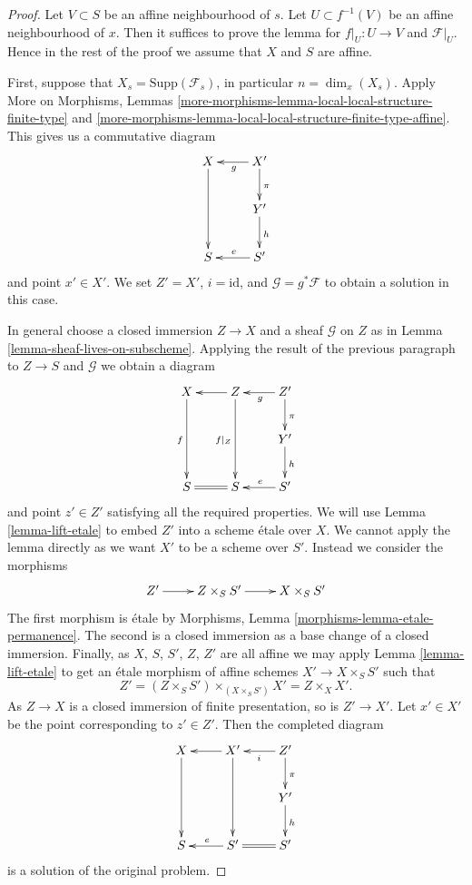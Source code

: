 \begin{proof}
Let $V \subset S$ be an affine neighbourhood of $s$.
Let $U \subset f^{-1}(V)$ be an affine neighbourhood of $x$.
Then it suffices to prove the lemma for $f|_U : U \to V$ and
$\mathcal{F}|_U$. Hence in the rest of the proof we assume that
$X$ and $S$ are affine.

\medskip\noindent
First, suppose that $X_s = \text{Supp}(\mathcal{F}_s)$, in particular
$n = \dim_x(X_s)$. Apply
More on Morphisms,
Lemmas \ref{more-morphisms-lemma-local-local-structure-finite-type} and
\ref{more-morphisms-lemma-local-local-structure-finite-type-affine}.
This gives us a commutative diagram
$$
\xymatrix{
X \ar[dd] & X' \ar[l]^g \ar[d]^\pi \\
& Y' \ar[d]^h  \\
S & S' \ar[l]_e 
}
$$
and point $x' \in X'$. We set $Z' = X'$, $i = \text{id}$, and
$\mathcal{G} = g^*\mathcal{F}$ to obtain a solution in this case.

\medskip\noindent
In general choose a closed immersion $Z \to X$ and a sheaf
$\mathcal{G}$ on $Z$ as in
Lemma \ref{lemma-sheaf-lives-on-subscheme}.
Applying the result of the previous paragraph to $Z \to S$ and
$\mathcal{G}$ we obtain a diagram
$$
\xymatrix{
X \ar[dd]_f & Z \ar[l] \ar[dd]_{f|_Z} & Z' \ar[l]^g \ar[d]^\pi \\
& & Y' \ar[d]^h \\
S & S \ar@{=}[l] & S' \ar[l]_e
}
$$
and point $z' \in Z'$ satisfying all the required properties.
We will use
Lemma \ref{lemma-lift-etale}
to embed $Z'$ into a scheme \'etale over $X$. We cannot apply the lemma directly
as we want $X'$ to be a scheme over $S'$. Instead we
consider the morphisms
$$
\xymatrix{
Z' \ar[r] & Z \times_S S' \ar[r] & X \times_S S'
}
$$
The first morphism is \'etale by
Morphisms, Lemma \ref{morphisms-lemma-etale-permanence}.
The second is a closed immersion as a base change of a closed immersion.
Finally, as $X$, $S$, $S'$, $Z$, $Z'$ are all affine we may apply
Lemma \ref{lemma-lift-etale}
to get an \'etale morphism of affine schemes $X' \to X \times_S S'$ such that 
$$
Z' = (Z \times_S S') \times_{(X \times_S S')} X' = Z \times_X X'.
$$
As $Z \to X$ is a closed immersion of finite presentation, so is $Z' \to X'$.
Let $x' \in X'$ be the point corresponding to $z' \in Z'$.
Then the completed diagram
$$
\xymatrix{
X \ar[dd] & X' \ar[dd] \ar[l] & Z' \ar[l]^i \ar[d]^\pi \\
& & Y' \ar[d]^h \\
S & S' \ar[l]_e & S' \ar@{=}[l]
}
$$
is a solution of the original problem.
\end{proof}

